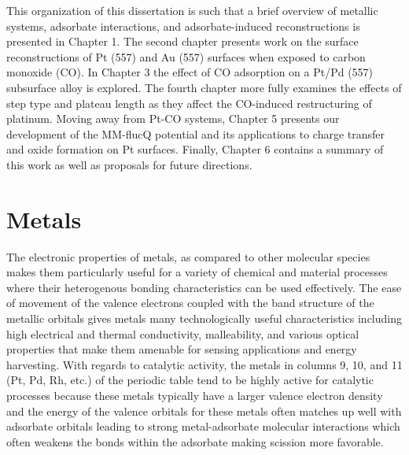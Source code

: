 
This organization of this dissertation is such that a brief overview of
metallic systems, adsorbate interactions, and adsorbate-induced reconstructions
is presented in Chapter 1.  The second chapter presents work on the surface
reconstructions of Pt (557) and Au (557) surfaces when exposed to carbon
monoxide (CO). In Chapter 3 the effect of CO adsorption on a Pt/Pd (557) subsurface
alloy is explored. The fourth chapter more fully examines the effects of step
type and plateau length as they affect the CO-induced restructuring of
platinum. Moving away from Pt-CO systems, Chapter 5 presents our development of
the MM-flucQ potential and its applications to charge transfer and oxide
formation on Pt surfaces. Finally, Chapter 6 contains a summary of this work as
well as proposals for future directions.

\section{Metals}
The electronic properties of metals, as compared to other molecular species
makes them particularly useful for a variety of chemical and material processes
where their heterogenous bonding characteristics can be used effectively. The
ease of movement of the valence electrons coupled with the band structure of
the metallic orbitals gives metals many technologically useful characteristics
including high electrical and thermal conductivity, malleability, and various
optical properties that make them amenable for sensing applications and energy
harvesting. With regards to catalytic activity, the metals in columns 9, 10,
and 11 (Pt, Pd, Rh, etc.) of the periodic table tend to be highly active for
catalytic processes because these metals typically have a larger valence
electron density and the energy of the valence orbitals for these metals often
matches up well with adsorbate orbitals leading to strong metal-adsorbate
molecular interactions which often weakens the bonds within the adsorbate
making scission more favorable.


